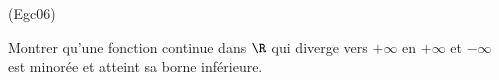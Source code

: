 \begin{tiny}(Egc06)\end{tiny}
Montrer qu'une fonction continue dans $\R$ qui diverge vers $+\infty $ en $+\infty $ et $-\infty $ est minor{\'e}e et atteint sa borne inf{\'e}rieure.